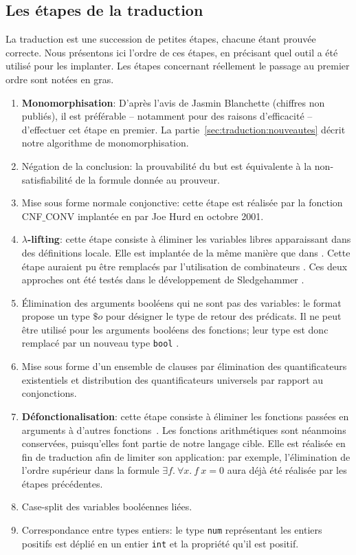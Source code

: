 \subsection{Les étapes de la traduction}
La traduction est une succession de petites étapes, chacune étant
prouvée correcte. Nous présentons ici l'ordre de ces étapes, en
précisant quel outil a été utilisé pour les implanter. Les étapes
concernant réellement le passage au premier ordre sont notées en gras.
\begin{enumerate}
\item \textbf{Monomorphisation}: D'après l'avis de Jasmin Blanchette (chiffres non publiés), il est préférable -- notamment pour des raisons
  d'efficacité -- d'effectuer cet étape en premier. La
  partie~\ref{sec:traduction:nouveautes} décrit notre algorithme de
  monomorphisation.
  \item Négation de la conclusion: la prouvabilité du but est
    équivalente à la non-satisfiabilité de la formule donnée au
    prouveur.
  \item Mise sous forme normale conjonctive: cette étape est réalisée
    par la fonction \textsf{CNF$\_$CONV} implantée en \holfour par Joe
    Hurd en octobre 2001.
  \item \textbf{$\lambda$-lifting}: cette étape consiste à éliminer les
    variables libres apparaissant dans des définitions locale. Elle est
    implantée de la même manière que dans \cite{Bohme12}. Cette étape
    auraient pu être remplacés par l'utilisation de combinateurs
    \cite{Hurd03}. Ces deux approches ont été testés dans le
    développement de Sledgehammer \cite{MengP08}.
  \item Élimination des arguments booléens qui ne sont pas des
    variables: le format \tff propose un type $\$o$ pour désigner le
    type de retour des prédicats. Il ne peut être utilisé pour les
    arguments booléens des fonctions; leur type est donc remplacé par un
    nouveau type \verb!bool! \cite{MengP08}.
  \item Mise sous forme d'un ensemble de clauses par élimination  des quantificateurs existentiels et distribution des quantificateurs universels par rapport au conjonctions.
  \item \textbf{Défonctionalisation}: cette étape consiste à éliminer
    les fonctions passées en arguments à d'autres
    fonctions~\cite{Hurd03,MengP08}.
    Les fonctions arithmétiques sont néanmoins conservées, puisqu'elles
    font partie de notre langage cible. Elle est réalisée en fin de
    traduction afin de limiter son application: par exemple,
    l'élimination de l'ordre supérieur dans la formule $\exists f.\
    \forall x.\ f\ x = 0$ aura déjà été réalisée par les étapes
    précédentes.
  \item Case-split des variables booléennes liées.
  \item Correspondance entre types entiers: le type \holfour \verb!num!
    représentant les entiers positifs est déplié en un entier \verb!int!
    et la propriété qu'il est positif.
\end{enumerate}

